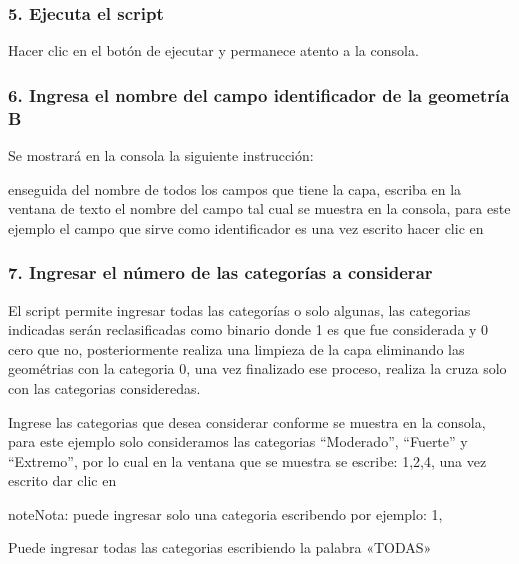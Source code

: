 \documentclass[letterpaper,10pt,spanish]{sphinxmanual}
\begin{document}
\subsubsection{5. Ejecuta el script}
\label{\detokenize{tabulacion_3geo:ejecuta-el-script}}
Hacer clic en el botón de ejecutar y permanece atento a la consola.


\subsubsection{6. Ingresa el nombre del campo identificador de la geometría B}
\label{\detokenize{tabulacion_3geo:ingresa-el-nombre-del-campo-identificador-de-la-geometria-b}}
Se mostrará en la consola la siguiente instrucción:


enseguida del nombre de todos los campos que tiene la capa, escriba en la
ventana de texto el nombre del campo tal cual se muestra en la consola,
para este ejemplo el campo que sirve como identificador es   una vez escrito
hacer clic en 

\noindent{}


\subsubsection{7. Ingresar el número de las categorías a considerar}
\label{\detokenize{tabulacion_3geo:ingresar-el-numero-de-las-categorias-a-considerar}}
El script permite ingresar todas las categorías o solo algunas, las categorias
indicadas serán reclasificadas como binario donde 1 es que fue considerada y 0 cero que no,
posteriormente realiza una limpieza de la capa eliminando las geométrias con la categoria 0,
una vez finalizado ese proceso, realiza la cruza solo con las categorias consideredas.

Ingrese las categorias que desea considerar conforme se muestra en la consola, para
este ejemplo solo consideramos las categorias “Moderado”, “Fuerte” y “Extremo”, por lo
cual en la ventana que se muestra se escribe: 1,2,4, una vez escrito dar clic en 

\begin{sphinxadmonition}{note}{Nota:}
puede ingresar solo una categoria escribendo por ejemplo: 1,

Puede ingresar todas las categorias escribiendo la palabra «TODAS»
\end{sphinxadmonition}
\end{document}
